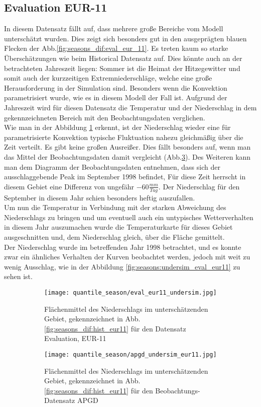 \subsection{Evaluation EUR-11}\label{sec:eval_eur_11}
In diesem Datensatz fällt auf, dass mehrere große Bereiche vom Modell unterschätzt wurden. Dies zeigt sich besonders gut in den ausgeprägten blauen Flecken der Abb.\ref{fig:seasons_dif:eval_eur_11}. Es treten kaum so starke Überschätzungen wie beim Historical Datensatz auf. Dies könnte auch an der betrachteten Jahreszeit liegen: Sommer ist die Heimat der Hitzegewitter und somit auch der kurzzeitigen Extremniederschläge, welche eine große Herausforderung in der Simulation sind. Besonders wenn die Konvektion parametrisiert wurde, wie es in diesem Modell der Fall ist. Aufgrund der Jahreszeit wird für diesen Datensatz die Temperatur und der Niederschlag in dem gekennzeichneten Bereich mit den Beobachtungsdaten verglichen.\\
Wie man in der Abbildung \ref{fig:season:under_eval_eur11} erkennt, ist der Niederschlag wieder eine für parametrisierte Konvektion typische Fluktuation nahezu gleichmäßig über die Zeit verteilt. Es gibt keine großen Ausreißer. Dies fällt besonders auf, wenn man das Mittel der Beobachtungsdaten damit vergleicht (Abb.\ref{fig:season:under_apgd_eur11}). Des Weiteren kann man dem Diagramm der Beobachtungsdaten entnehmen, dass sich der ausschlaggebende Peak im September 1998 befindet, Für diese Zeit herrscht in diesem Gebiet eine Differenz von ungefähr $-60\frac{mm}{Tag}$. Der Niederschlag für den September in diesem Jahr schien besonders heftig auszufallen.\\
Um nun die Temperatur in Verbindung mit der starken Abweichung des Niederschlags zu bringen und um eventuell auch ein untypisches Wetterverhalten in diesem Jahr auszumachen wurde die Temperaturkarte für dieses Gebiet ausgeschnitten und, dem Niederschlag gleich, über die Fläche gemittelt.\\
Der Niederschlag wurde im betreffenden Jahr 1998 betrachtet, und es konnte zwar ein ähnliches Verhalten der Kurven beobachtet werden, jedoch mit weit zu wenig Ausschlag, wie in der Abbildung \ref{fig:seasons:undersim_eval_eur11} zu sehen ist.
\begin{figure}[h]
	\begin{subfigure}{0.49\textwidth}
		\texttt{[image: quantile\_season/eval\_eur11\_undersim.jpg]}
		\caption{Flächenmittel des Niederschlags im unterschätzenden Gebiet, gekennzeichnet in Abb.\ref{fig:seasons_dif:hist_eur11} für den Datensatz Evaluation, EUR-11}
		\label{fig:season:under_eval_eur11}
	\end{subfigure}
	\begin{subfigure}{0.49\textwidth}
		\texttt{[image: quantile\_season/apgd\_undersim\_eur11.jpg]}
		\caption{Flächenmittel des Niederschlags im unterschätzenden Gebiet, gekennzeichnet in Abb.\ref{fig:seasons_dif:hist_eur11} für den Beobachtungs-Datensatz APGD}
		\label{fig:season:under_apgd_eur11}
	\end{subfigure}
	\caption{}
\end{figure}
